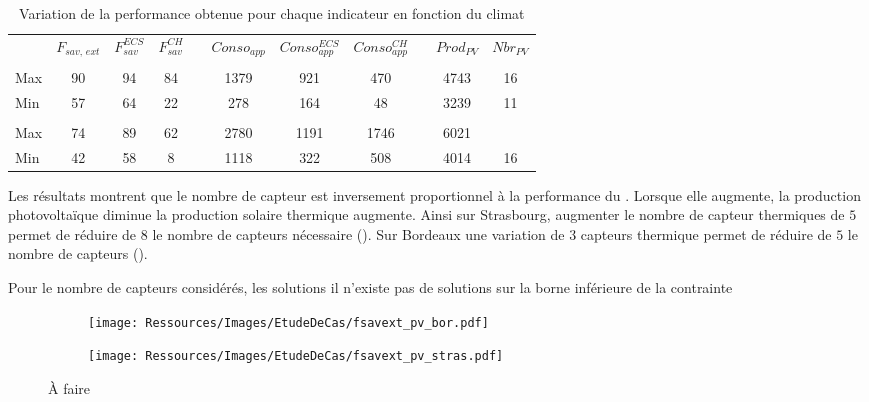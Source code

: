 \begin{table}
\centering
\caption[Performance maximale pouvant être obtenue pour différents indicateurs]
         {Variation de la performance obtenue pour chaque indicateur en fonction du climat}
\label{tab:bornes_front_pareto}
\begin{tabular}{L{2cm} c c c c c c c c c c}
    \toprule
                & $F_{sav,\,ext}$ & $F_{sav}^{ECS}$ & $F_{sav}^{CH}$ & & $Conso_{app}$ & $Conso_{app}^{ECS}$ & $Conso_{app}^{CH}$ & & $Prod_{PV}$ & $Nbr_{PV}$ \\
    \addlinespace
     \\
    \midrule
    Max & 90  & 94  & 84  &   & 1379  & 921 & 470 &   & 4743  & 16  \\
    Min & 57  & 64  & 22  &   & 278 & 164 & 48  &   & 3239  & 11  \\
    \addlinespace
     \\
    \midrule
    Max & 74  & 89  & 62  &   & 2780  & 1191  & 1746  &   & 6021  &   \\
    Min & 42  & 58  & 8 &   & 1118  & 322 & 508 &   & 4014  & 16  \\
    \bottomrule
\end{tabular}
\end{table}



Les résultats montrent que le nombre de capteur  est inversement proportionnel
à la performance du . Lorsque elle augmente, la production photovoltaïque
diminue la production solaire thermique augmente. Ainsi sur Strasbourg, augmenter
le nombre de capteur thermiques de $5$ permet de réduire de $8$ le nombre de
capteurs  nécessaire (). Sur Bordeaux une variation de $3$ capteurs
thermique permet de réduire de $5$ le nombre de capteurs  ().

Pour le nombre de capteurs  considérés, les solutions  il n’existe pas de solutions
sur la borne inférieure de la contrainte



\begin{figure}
    \centering
    \begin{subfigure}[b]{0.48\textwidth}
        \centering
        \texttt{[image: Ressources/Images/EtudeDeCas/fsavext\_pv\_bor.pdf]}
        \caption{}
        \label{fig:fsav_pv_bor}
    \end{subfigure}
    \quad
    \begin{subfigure}[b]{0.48\textwidth}
        \centering
        \texttt{[image: Ressources/Images/EtudeDeCas/fsavext\_pv\_stras.pdf]}
        \caption{}
        \label{fig:fsav_pv_stras}
    \end{subfigure}
    \caption[À faire]
             {À faire}
    \label{fig:fsav_pv_bor_stras}
\end{figure}




